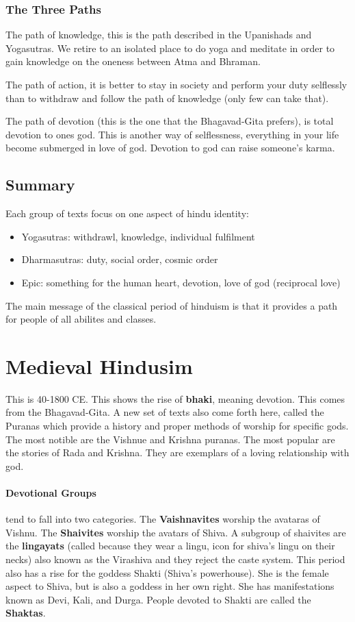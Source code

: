 \documentclass{article}
\begin{document}
\subsubsection*{The Three Paths}
\label{sub:the_three_paths}
The path of knowledge, this is the path described in the Upanishads and Yogasutras. We retire to an isolated place to do yoga and meditate in order to gain knowledge on the oneness between Atma and Bhraman.

The path of action, it is better to stay in society and perform your duty selflessly than to withdraw and follow the path of knowledge (only few can take that).

The path of devotion (this is the one that the Bhagavad-Gita prefers), is total devotion to ones god. This is another way of selflessness, everything in your life become submerged in love of god. Devotion to god can raise someone's karma.


\subsection*{Summary}
 \label{sec:summary}
Each group of texts focus on one aspect of hindu identity:
\begin{itemize}
	\item Yogasutras: withdrawl, knowledge, individual fulfilment
	\item Dharmasutras: duty, social order, cosmic order
	\item Epic: something for the human heart, devotion, love of god (reciprocal love)
\end{itemize}

The main message of the classical period of hinduism is that it provides a path for people of all abilites and classes.

\section*{Medieval Hindusim}
\label{sec:medieval_hindusim}
This is 40-1800 CE. This shows the rise of \textbf{bhaki}, meaning devotion. This comes from the Bhagavad-Gita. A new set of texts also come forth here, called the Puranas which provide a history and proper methods of worship for specific gods. The most notible are the Vishnue and Krishna puranas. The most popular are the stories of Rada and Krishna. They are exemplars of a loving relationship with god.

\paragraph{Devotional Groups}
\label{par:devotional_groups}
tend to fall into two categories. The \textbf{Vaishnavites} worship the avataras of Vishnu. The \textbf{Shaivites} worship the avatars of Shiva. A subgroup of shaivites are the \textbf{lingayats} (called because they wear a lingu, icon for shiva's lingu on their necks) also known as the Virashiva and they reject the caste system. This period also has a rise for the goddess Shakti (Shiva's powerhouse). She is the female aspect to Shiva, but is also a goddess in her own right. She has manifestations known as Devi, Kali, and Durga. People devoted to Shakti are called the \textbf{Shaktas}.
\end{document}
